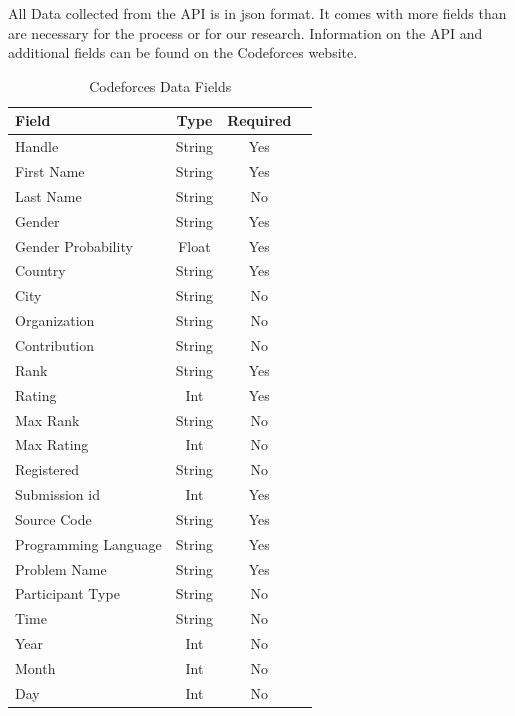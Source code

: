 \documentclass{article}
\begin{document}
All Data collected from the API is in json format. It comes with more fields than are necessary for the process or for our research. Information on the API and additional fields can be found on the Codeforces website.

\begin{table}[t]
    \begin{center}
        \caption{Codeforces Data Fields}
        \label{tab:cf_data}
        \begin{tabular}{|l | c | c | c |}
            \hline
            \textbf{Field} & \textbf{Type} & \textbf{Required}\\
            \hline
            Handle & String & Yes\\
            First Name & String & Yes\\
            Last Name & String & No\\
            Gender & String & Yes\\
            Gender Probability & Float & Yes\\
            Country & String & Yes\\
            City & String & No\\
            Organization & String & No\\
            Contribution & String & No\\
            Rank & String & Yes\\
            Rating & Int & Yes\\
            Max Rank & String & No\\
            Max Rating & Int & No\\
            Registered & String & No\\
            \hline
            Submission id & Int & Yes\\
            Source Code & String & Yes\\
            Programming Language & String & Yes\\
            Problem Name & String & Yes\\
            Participant Type & String & No\\
            Time & String & No\\
            Year & Int & No\\
            Month & Int & No\\
            Day & Int & No\\
            \hline
        \end{tabular}
    \end{center}
\end{table}
\end{document}

